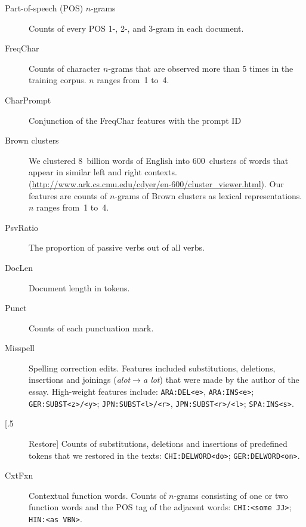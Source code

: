 \documentclass[landscape,final]{baposter}
\newcommand{\feat}[1]{\textsmaller[.5]{\textsf{#1}}} %
\newcommand{\textnl}{\textit}
\begin{document}
\begin{poster}
{\begin{description}
\item [Part-of-speech (POS) $n$-grams] Counts of every POS 1-, 2-, and 3-gram in each document. %
\item [FreqChar] Counts of character $n$-grams that are observed more than 5 times in the training corpus. $n$ ranges from~1 to~4.
\item [CharPrompt] Conjunction of the FreqChar features with the prompt ID %
\item [Brown clusters] We clustered 8~billion words of English into 600~clusters of words that appear in similar left and right contexts. (\url{http://www.ark.cs.cmu.edu/cdyer/en-600/cluster_viewer.html}). Our features are counts of $n$-grams of Brown clusters as lexical representations. $n$ ranges from~1 to~4.
\item[PsvRatio] The proportion of passive verbs out of all verbs.
\item[DocLen] Document length in tokens.
\item[Punct] Counts of each punctuation mark. 
\item[Misspell] Spelling correction edits. Features included substitutions, deletions, insertions and joinings (\textnl{alot}$\rightarrow$\textnl{a lot}) that were made by the author of the essay. High-weight features include: {\tt ARA:DEL<e>}, {\tt ARA:INS<e>}; {\tt GER:SUBST<z>/<y>}; {\tt JPN:SUBST<l>/<r>}, {\tt JPN:SUBST<r>/<l>}; {\tt SPA:INS<s>}.%
\item[\feat{Restore}] Counts of substitutions, deletions and
  insertions of predefined tokens that we restored in the texts: {\tt CHI:DELWORD<do>}; {\tt GER:DELWORD<on>}.%
\item[CxtFxn] Contextual function words. Counts of $n$-grams consisting of one or two function words and the POS tag of the adjacent words: {\tt CHI:<some JJ>}; \mbox{\tt HIN:<as VBN>}. 

\end{description}
}  
\end{poster}
\end{document}
